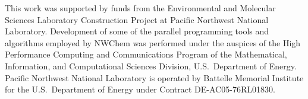 %
%

This work was supported by funds from the Environmental and Molecular
Sciences Laboratory Construction Project at Pacific Northwest National
Laboratory.  Development of some of the parallel programming tools and
algorithms employed by NWChem was performed under the auspices of the
High Performance Computing and Communications Program of the
Mathematical, Information, and Computational Sciences Division, U.S.\
Department of Energy.  Pacific Northwest National Laboratory is
operated by Battelle Memorial Institute for the U.S.\ Department of
Energy under Contract DE-AC05-76RL01830.

